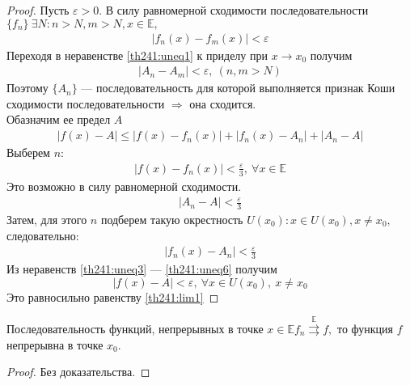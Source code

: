 \begin{proof}
  Пусть $\varepsilon > 0.$ В силу равномерной сходимости последовательности
  $\{f_n\} \ \exists N : n > N, m > N, x \in \mathbb{E},$
  \begin{gather}
    \left|f_n(x) - f_m(x)\right| < \varepsilon \label{th241:uneq1}
  \end{gather}
  Переходя в неравенстве \eqref{th241:uneq1} к приделу при $x \to x_0$ получим
  \begin{gather}
    \left|A_n - A_m \right| < \varepsilon, \ (n, m > N) \label{th241:uneq2}
  \end{gather}
  Поэтому $\{A_n\}$ --- последовательность для которой выполняется признак
  Коши сходимости последовательности $\Rightarrow$ она сходится. \\
  Обазначим ее предел $A$ \\
  \begin{gather}
    \left|f(x) - A\right| \leq \left|f(x) - f_n(x)\right| +
    \left|f_n(x) - A_n\right| + \left|A_n - A\right| \label{th241:uneq3}
  \end{gather}
  Выберем $n:$
  \begin{gather}
    |f(x) - f_n(x)| < \frac{\varepsilon}{3}, \ \forall x \in \mathbb{E}
    \label{th241:uneq4}
  \end{gather}
  Это возможно в силу равномерной сходимости.
  \begin{gather}
    |A_n - A| < \frac{\varepsilon}{3} \label{th241:uneq5}
  \end{gather}
  Затем, для этого $n$ подберем такую окрестность
  $U(x_0): x \in U(x_0), x \not = x_0,$ следовательно:
  \begin{gather}
    |f_n(x) - A_n| < \frac{\varepsilon}{3} \label{th241:uneq6}
  \end{gather}
  Из неравенств \eqref{th241:uneq3} --- \eqref{th241:uneq6} получим
  $$|f(x) - A| < \varepsilon, \ \forall x \in U(x_0), \ x \not = x_0$$
  Это равносильно равенству \eqref{th241:lim1}
\end{proof}

\begin{theorem}
  \label{th242}
  Последовательность функций, непрерывных в точке $x \in \mathbb{E}
  f_n \stackrel{\mathrm{\mathbb{E}}}{\rightrightarrows} f,$ то функция
  $f$ непрерывна в точке $x_0$.
\end{theorem}

\begin{proof}
  Без доказательства.
\end{proof}


